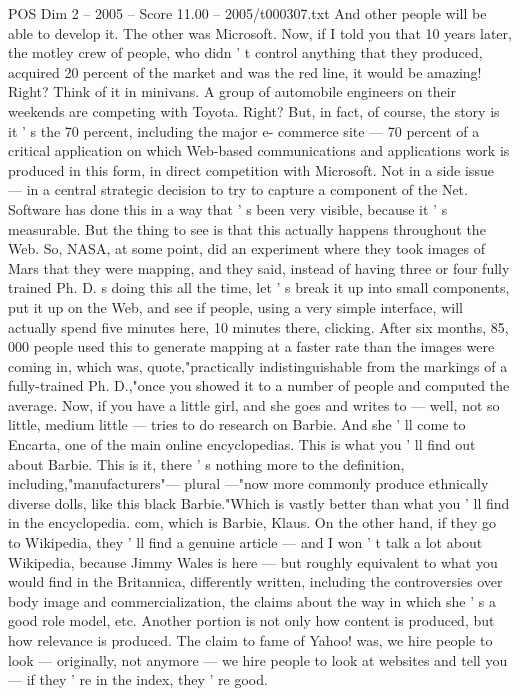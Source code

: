 \begin{textsample}{POS Dim 2 – 2005 – Score 11.00 – 2005/t000307.txt}
And other people will be able to develop it.
The other was Microsoft.
Now, if I told you that 10 years later, the motley crew of people, who didn ' t control anything that they produced, acquired 20 percent of the market and was the red line, it would be amazing!
Right?
Think of it in minivans.
A group of automobile engineers on their weekends are competing with Toyota.
Right?
But, in fact, of course, the story is it ' s the 70 percent, including the major e- commerce site — 70 percent of a critical application on which Web-based communications and applications work is produced in this form, in direct competition with Microsoft.
Not in a side issue — in a central strategic decision to try to capture a component of the Net.
Software has done this in a way that ' s been very visible, because it ' s measurable.
But the thing to see is that this actually happens throughout the Web.
So, NASA, at some point, did an experiment where they took images of Mars that they were mapping, and they said, instead of having three or four fully trained Ph.
D. s doing this all the time, let ' s break it up into small components, put it up on the Web, and see if people, using a very simple interface, will actually spend five minutes here, 10 minutes there, clicking.
After six months, 85, 000 people used this to generate mapping at a faster rate than the images were coming in, which was, quote,"practically indistinguishable from the markings of a fully-trained Ph.
D.,"once you showed it to a number of people and computed the average.
Now, if you have a little girl, and she goes and writes to — well, not so little, medium little — tries to do research on Barbie.
And she ' ll come to Encarta, one of the main online encyclopedias.
This is what you ' ll find out about Barbie.
This is it, there ' s nothing more to the definition, including,"manufacturers"— plural —"now more commonly produce ethnically diverse dolls, like this black Barbie."Which is vastly better than what you ' ll find in the encyclopedia. com, which is Barbie, Klaus.
On the other hand, if they go to Wikipedia, they ' ll find a genuine article — and I won ' t talk a lot about Wikipedia, because Jimmy Wales is here — but roughly equivalent to what you would find in the Britannica, differently written, including the controversies over body image and commercialization, the claims about the way in which she ' s a good role model, etc.
Another portion is not only how content is produced, but how relevance is produced.
The claim to fame of Yahoo! was, we hire people to look — originally, not anymore — we hire people to look at websites and tell you — if they ' re in the index, they ' re good.

\end{textsample}
